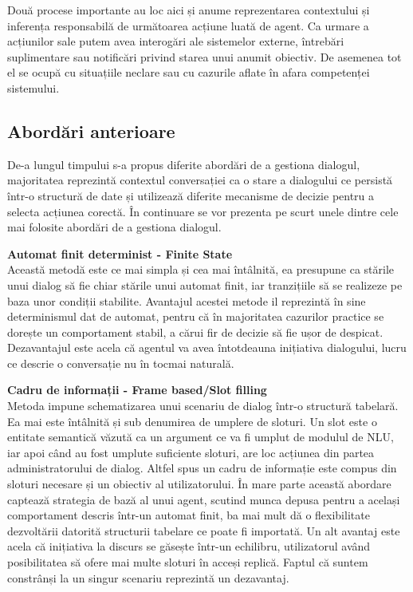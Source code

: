 Două procese importante au loc aici și anume reprezentarea contextului și inferența responsabilă de următoarea acțiune luată de agent.
Ca urmare a acțiunilor sale putem avea interogări ale sistemelor externe, întrebări suplimentare sau notificări privind starea unui anumit obiectiv.
De asemenea tot el se ocupă cu situațiile neclare sau cu cazurile aflate în afara competenței sistemului.

\subsection{Abordări anterioare}

De-a lungul timpului s-a propus diferite abordări de a gestiona dialogul, majoritatea reprezintă contextul conversației ca o stare a dialogului ce persistă într-o structură de date și utilizează diferite mecanisme de decizie pentru a selecta acțiunea corectă. În continuare se vor prezenta pe scurt unele dintre cele mai folosite abordări de a gestiona dialogul.

\textbf{Automat finit determinist - Finite State}\\
Această metodă este ce mai simpla și cea mai întâlnită, ea presupune ca stările unui dialog să fie chiar stările unui automat finit, iar tranzițiile să se realizeze pe baza unor condiții stabilite. Avantajul acestei metode il reprezintă în sine determinismul dat de automat, pentru că în majoritatea cazurilor practice se dorește un comportament stabil, a cărui fir de decizie să fie ușor de despicat. Dezavantajul este acela că agentul va avea întotdeauna inițiativa dialogului, lucru ce descrie o conversație nu în tocmai naturală.
	
\textbf{Cadru de informații - Frame based/Slot filling}\\
Metoda impune schematizarea unui scenariu de dialog într-o structură tabelară. Ea mai este întâlnită și sub denumirea de umplere de sloturi. Un slot este o entitate semantică văzută ca un argument ce va fi umplut de modulul de NLU, iar apoi când au fost umplute suficiente sloturi, are loc acțiunea din partea administratorului de dialog. Altfel spus un cadru de informație este compus din sloturi necesare și un obiectiv al utilizatorului. În mare parte această abordare captează strategia de bază al unui agent, scutind munca depusa pentru a același comportament descris într-un automat finit, ba mai mult dă o flexibilitate dezvoltării datorită structurii tabelare ce poate fi importată. Un alt avantaj este acela că inițiativa la discurs se găsește într-un echilibru, utilizatorul având posibilitatea să ofere mai multe sloturi în acceși replică. Faptul că suntem constrânși la un singur scenariu reprezintă un dezavantaj.

